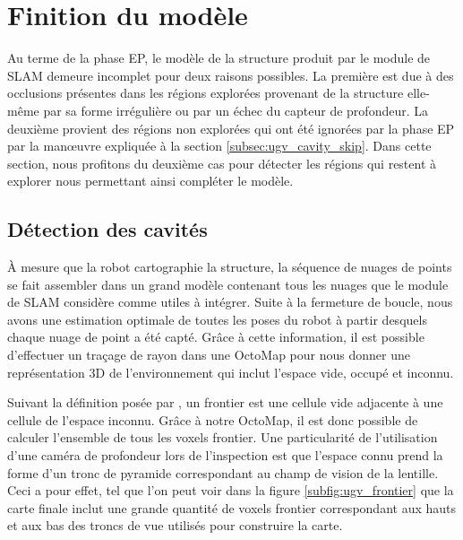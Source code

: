 \section{Finition du modèle} \label{sec:cavity_exploration}

Au terme de la phase EP, le modèle de la structure produit par le module de SLAM demeure incomplet pour deux raisons possibles. La première est due à des occlusions présentes dans les régions explorées provenant de la structure elle-même par sa forme irrégulière ou par un échec du capteur de profondeur. La deuxième provient des régions non explorées qui ont été ignorées par la phase EP par la man\oe uvre expliquée à la section \ref{subsec:ugv_cavity_skip}. Dans cette section, nous profitons du deuxième cas pour détecter les régions qui restent à explorer nous permettant ainsi compléter le modèle.

\subsection{Détection des cavités}

À mesure que la robot cartographie la structure, la séquence de nuages de points se fait assembler dans un grand modèle contenant tous les nuages que le module de SLAM considère comme utiles à intégrer. Suite à la fermeture de boucle, nous avons une estimation optimale de toutes les poses du robot à partir desquels chaque nuage de point a été capté. Grâce à cette information, il est possible d'effectuer un traçage de rayon dans une OctoMap \citep{Hornung2013} pour nous donner une représentation 3D de l'environnement qui inclut l'espace vide, occupé et inconnu.

Suivant la définition posée par \citep{Yamauchi1997}, un frontier est une cellule vide adjacente à une cellule de l'espace inconnu. Grâce à notre OctoMap, il est donc possible de calculer l'ensemble de tous les voxels frontier. Une particularité de l'utilisation d'une caméra de profondeur lors de l'inspection est que l'espace connu prend la forme d'un tronc de pyramide correspondant au champ de vision de la lentille. Ceci a pour effet, tel que l'on peut voir dans la figure \ref{subfig:ugv_frontier} que la carte finale inclut une grande quantité de voxels frontier correspondant aux hauts et aux bas des troncs de vue utilisés pour construire la carte.

